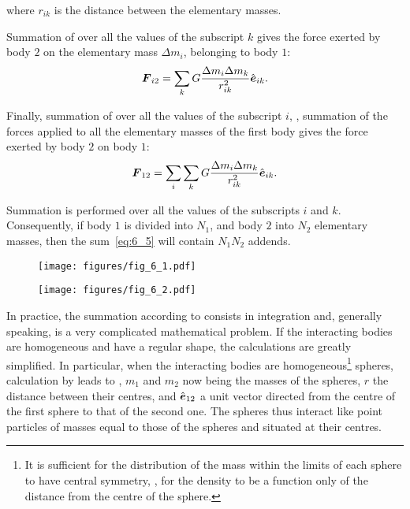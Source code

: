 \noindent
where $r_{ik}$ is the distance between the elementary masses.

Summation of  over all the values of the subscript $k$ gives the force exerted by body $2$ on the elementary mass $\Delta m_i$, belonging to body $1$:
\begin{equation}\label{eq:6_4}
	\boldsymbol{F}_{i2} = \sum_k G\frac{\Delta m_i\Delta m_k}{r_{ik}^2}\hat{\boldsymbol{e}}_{ik}.
\end{equation}

\noindent
Finally, summation of  over all the values of the subscript $i$, \ie, summation of the forces applied to all the elementary masses of the first body gives the force exerted by body $2$ on body $1$:
\begin{equation}\label{eq:6_5}
	\boldsymbol{F}_{12} = \sum_i \sum_k G\frac{\Delta m_i\Delta m_k}{r_{ik}^2}\hat{\boldsymbol{e}}_{ik}.
\end{equation}

\noindent
Summation is performed over all the values of the subscripts $i$ and $k$. Consequently, if body $1$ is divided into $N_1$, and body $2$ into $N_2$ elementary masses, then the sum~\eqref{eq:6_5} will contain $N_1N_2$ addends.

\begin{figure}[t]
	\begin{minipage}[t]{0.5\linewidth}
		\begin{center}
			\texttt{[image: figures/fig\_6\_1.pdf]}
			\caption[]{}
			\label{fig:6_1}
		\end{center}
	\end{minipage}
	\hspace{-0.05cm}
	\begin{minipage}[t]{0.5\linewidth}
		\begin{center}
			\texttt{[image: figures/fig\_6\_2.pdf]}
			\caption[]{}
			\label{fig:6_2}
		\end{center}
	\end{minipage}
	\vspace{-0.3cm}
\end{figure}

In practice, the summation according to  consists in integration and, generally speaking, is a very complicated mathematical problem. If the interacting bodies are homogeneous and have a regular shape, the calculations are greatly simplified. In particular, when the interacting bodies are homogeneous\footnote{It is sufficient for the distribution of the mass within the limits of each sphere to have central symmetry, \ie, for the density to be a function only of the	distance from the centre of the sphere.} spheres, calculation by  leads to , $m_1$ and $m_2$ now being the masses of the spheres, $r$ the distance between their centres, and $\hat{\boldsymbol{e}}_{12}$ a unit vector directed from the centre of the first sphere to that of the second one. The spheres thus interact like point particles of masses equal to those of the spheres and situated at their centres.

